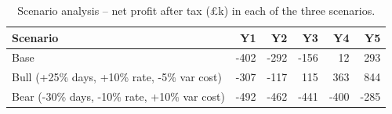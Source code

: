 \begin{table}[H]
\centering
\small
\caption{Scenario analysis -- net profit after tax (\pounds k) in each 
of the three scenarios.}
\label{tab:scenarios}
\begin{tabular}{lrrrrr}
\toprule
\textbf{Scenario} & \textbf{Y1} & \textbf{Y2} & \textbf{Y3} & \textbf{Y4} & \textbf{Y5} \\
\midrule
Base & -402 & -292 & -156 & 12 & 293 \\
Bull (+25\% days, +10\% rate, -5\% var cost) & -307 & -117 & 115 & 363 & 844 \\
Bear (-30\% days, -10\% rate, +10\% var cost) & -492 & -462 & -441 & -400 & -285 \\
\bottomrule
\end{tabular}
\end{table}
